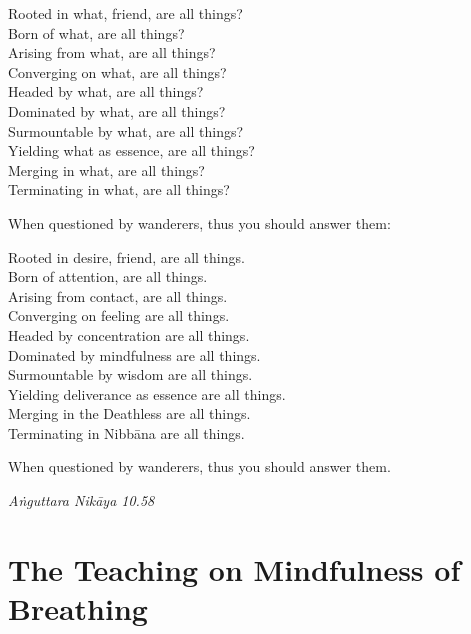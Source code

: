\begin{english}
  Rooted in what, friend, are all things?\\
  Born of what, are all things?\\
  Arising from what, are all things?\\
  Converging on what, are all things?\\
  Headed by what, are all things?\\
  Dominated by what, are all things?\\
  Surmountable by what, are all things?\\
  Yielding what as essence, are all things?\\
  Merging in what, are all things?\\
  Terminating in what, are all things?

  \bigskip

  When questioned by wanderers, thus you should answer them:

  \bigskip

  Rooted in desire, friend, are all things.\\
  Born of attention, are all things.\\
  Arising from contact, are all things.\\
  Converging on feeling are all things.\\
  Headed by concentration are all things.\\
  Dominated by mindfulness are all things.\\
  Surmountable by wisdom are all things.\\
  Yielding deliverance as essence are all things.\\
  Merging in the Deathless are all things.\\
  Terminating in Nibbāna are all things.

  \bigskip

  When questioned by wanderers, thus you should answer them.
\end{english}

{\raggedleft
  \emph{Aṅguttara Nikāya 10.58}
\par}

\chapter{The Teaching on Mindfulness of Breathing}


\begin{leader}
\end{leader}

